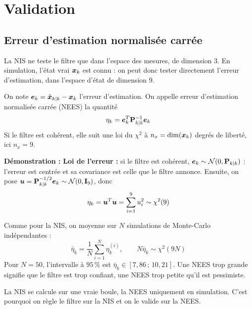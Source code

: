 
\section{Validation}
\subsection{Erreur d'estimation normalisée carrée}
La NIS ne teste le filtre que dans l'espace des mesures, de dimension $3$. En simulation, l'état vrai $\bm{x}_k$ est connu : on peut donc tester directement l'erreur d'estimation, dans l'espace d'état de dimension $9$.

\begin{definition}
    On note $\bm{e}_k = \hat{\bm{x}}_{k|k} - \bm{x}_k$ l'erreur d'estimation. On appelle erreur d'estimation normalisée carrée (NEES) la quantité
    \[
        \eta_k = \bm{e}_k^T\mathbf{P}_{k|k}^{-1}\bm{e}_k
    \]
    Si le filtre est cohérent, elle suit une loi du $\chi^2$ à $n_x = \dim(\bm{x}_k)$ degrés de liberté, ici $n_x = 9$.
\end{definition}
\textbf{Démonstration : }
\textbf{Loi de l'erreur : } si le filtre est cohérent, $\bm{e}_k \sim \mathcal{N}(0, \mathbf{P}_{k|k})$ : l'erreur est centrée et sa covariance est celle que le filtre annonce.
Ensuite, on pose $\bm{u} = \mathbf{P}_{k|k}^{-1/2}\bm{e}_k \sim \mathcal{N}(0, \mathbf{I}_9)$, donc
\[
        \eta_k = \bm{u}^T\bm{u} = \sum_{i=1}^{9} u_i^2 \sim \chi^2(9)
\]

Comme pour la NIS, on moyenne sur $N$ simulations de Monte-Carlo indépendantes :
\[
    \bar{\eta}_k = \frac{1}{N}\sum_{i=1}^{N}\eta_k^{(i)}, \qquad N\bar{\eta}_k \sim \chi^2(9N)
\]
Pour $N = 50$, l'intervalle à $95\,\%$ est $\bar{\eta}_k \in [7{,}86 \,;\, 10{,}21]$. Une NEES trop grande signifie que le filtre est trop confiant, une NEES trop petite qu'il est pessimiste.

\begin{remarque}
    La NIS se calcule sur une vraie boule, la NEES uniquement en simulation. C'est pourquoi on règle le filtre sur la NIS et on le valide sur la NEES.
\end{remarque}
